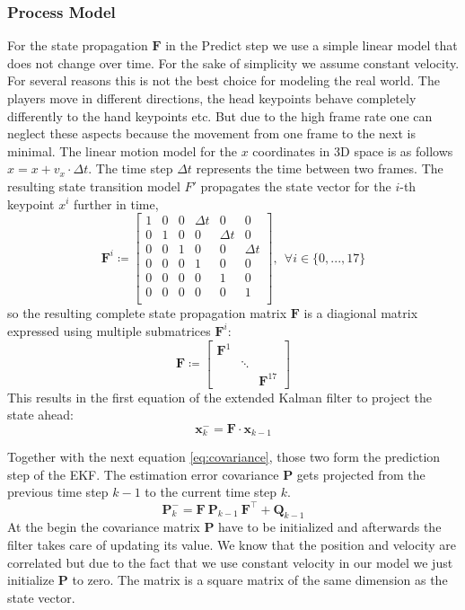 \subsubsection{Process Model}
For the state propagation $\mathbf{F}$ in the Predict step we use a simple linear model that does not change over time. For the sake of simplicity we assume constant velocity. For several reasons this is not the best choice for modeling the real world. The players move in different directions, the head keypoints behave completely differently to the hand keypoints etc. But due to the high frame rate one can neglect these aspects because the movement from one frame to the next is minimal. The linear motion model for the $x$ coordinates in 3D space is as follows $x = x + v_x\cdot \Delta t$. The time step $\Delta t$ represents the time between two frames. The resulting state transition model $F'$ propagates the state vector for the $i$-th keypoint $x^i$ further in time,
\begin{equation}
\mathbf{F}^i \coloneqq 
\begin{bmatrix}
1 & 0 & 0 & \Delta t & 0 & 0 \\
0 & 1 & 0 & 0 & \Delta t & 0 \\
0 & 0 & 1 & 0 & 0 & \Delta t \\
0 & 0 & 0 & 1 & 0 & 0 \\
0 & 0 & 0 & 0 & 1 & 0 \\
0 & 0 & 0 & 0 & 0 & 1 \\
\end{bmatrix}, \ \ \forall i \in \{0,...,17\}
\end{equation}
so the resulting complete state propagation matrix $\mathbf{F}$ is a diagional matrix expressed using multiple submatrices $\mathbf{F}^i$:
\begin{equation}
\mathbf{F} \coloneqq 
\begin{bmatrix}
\mathbf{F}^1 & & \\
& \ddots & \\
& & \mathbf{F}^{17}
\end{bmatrix}
\end{equation}
This results in the first equation of the extended Kalman filter to project the state ahead:
\begin{equation}\label{eq:state}
\mathbf{x}_k^- = \mathbf{F} \cdot \mathbf{x}_{k-1}
\end{equation}

Together with the next equation \ref{eq:covariance}, those two form the prediction step of the EKF. The estimation error covariance $\mathbf{P}$ gets projected  from the previous time step $k-1$ to the current time step $k$.
\begin{equation}\label{eq:covariance}
\mathbf{P}_k^- = \mathbf{F}\ \mathbf{P}_{k-1}\ \mathbf{F}^\intercal + \mathbf{Q}_{k-1}
\end{equation}
At the begin the covariance matrix $\mathbf{P}$ have to be initialized and afterwards the filter takes care of updating its value. We know that the position and velocity are correlated but due to the fact that we use constant velocity in our model we just initialize $\mathbf{P}$ to zero. The matrix is a square matrix of the same dimension as the state vector. 

